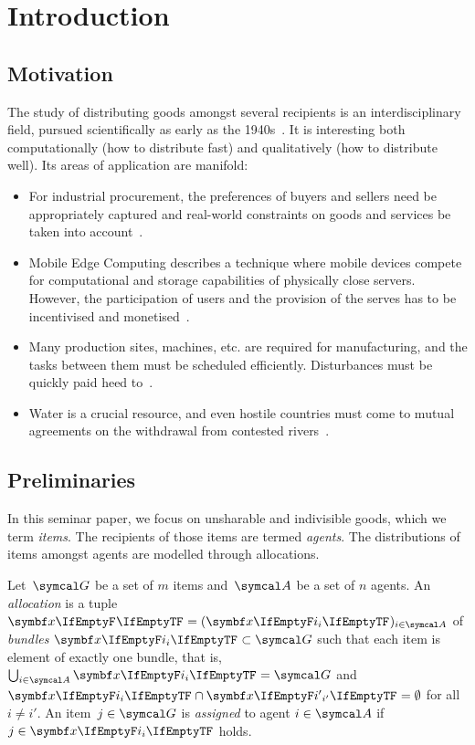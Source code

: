 \section{Introduction}
\label{sec:intro}

\subsection{Motivation}
\label{subsec:intro:motivation}

The study of distributing goods amongst several recipients is an interdisciplinary field, pursued scientifically as early as the 1940s~\cite{the_problem_of_fair_division}.
It is interesting both computationally (how to distribute fast) and qualitatively (how to distribute well).
Its areas of application are manifold:
\begin{itemize}
	\item
	For industrial procurement, the preferences of buyers and sellers need be appropriately captured and real-world constraints on goods and services be taken into account~\cite{survey}.

	\item
	Mobile Edge Computing describes a technique where mobile devices compete for computational and storage capabilities of physically close servers.
	However, the participation of users and the provision of the serves has to be incentivised and monetised~\cite{edge_computing_auction, edge_computing_report}.

	\item
	Many production sites, machines, etc. are required for manufacturing, and the tasks between them must be scheduled efficiently.
	Disturbances must be quickly paid heed to~\cite{survey}.

	\item
	Water is a crucial resource, and even hostile countries must come to mutual agreements on the withdrawal from contested rivers~\cite{water_management}.
\end{itemize}

\subsection{Preliminaries}
\label{subsec:intro:prelim}

In this seminar paper, we focus on unsharable and indivisible goods, which we term \emph{items}.
The recipients of those items are termed \emph{agents}.
The distributions of items amongst agents are modelled through allocations.
\begin{definition}
	Let~\(\goods\) be a set of \(m\) items and~\(\agents\) be a set of \(n\) agents.
	An \emph{allocation} is a tuple \(\alloc[][] = (\alloc)_{i \in \agents}\) of \emph{bundles} \(\alloc \subset \goods\) such that each item is element of exactly one bundle, that is, \(\bigcup_{i \in \agents} \alloc = \goods\) and \(\alloc \cap \alloc[][i'] = \emptyset\) for all \(i \neq i'\).
	An item~\(j \in \goods\) is \emph{assigned} to agent \(i \in \agents\) if \(j \in \alloc\) holds.
\end{definition}


